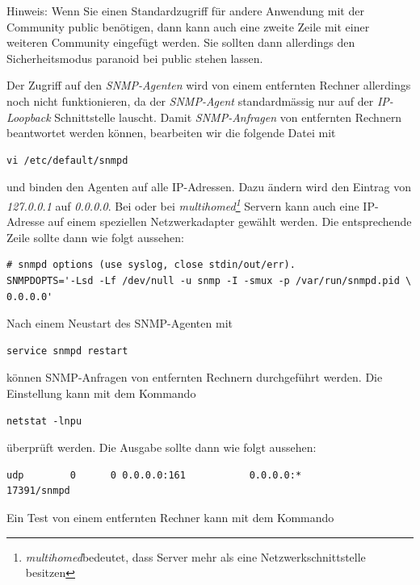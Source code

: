 Hinweis: Wenn Sie einen Standardzugriff für andere Anwendung mit der Community public benötigen, dann kann auch eine zweite Zeile mit einer weiteren Community eingefügt werden. Sie sollten dann allerdings den Sicherheitsmodus paranoid bei public stehen lassen. 

Der Zugriff auf den \emph{SNMP-Agenten} wird von einem entfernten Rechner allerdings noch nicht funktionieren, da der \emph{SNMP-Agent} standardmässig nur auf der \emph{IP-Loopback} Schnittstelle lauscht. Damit \emph{SNMP-Anfragen} von entfernten Rechnern beantwortet werden können, bearbeiten wir die folgende Datei mit

\begin{lstlisting}[numbers=none]
vi /etc/default/snmpd
\end{lstlisting}

und binden den Agenten auf alle IP-Adressen. Dazu ändern wird den Eintrag von \emph{127.0.0.1} auf \emph{0.0.0.0}. Bei oder bei \emph{multihomed\footnote{\emph{multihomed}bedeutet, dass Server mehr als eine Netzwerkschnittstelle besitzen}} Servern kann auch eine IP-Adresse auf einem speziellen Netzwerkadapter gewählt werden. Die entsprechende Zeile sollte dann wie folgt aussehen:

\begin{lstlisting}
# snmpd options (use syslog, close stdin/out/err).
SNMPDOPTS='-Lsd -Lf /dev/null -u snmp -I -smux -p /var/run/snmpd.pid \
0.0.0.0'
\end{lstlisting}

Nach einem Neustart des SNMP-Agenten mit

\begin{lstlisting}[numbers=none]
service snmpd restart
\end{lstlisting}

können SNMP-Anfragen von entfernten Rechnern durchgeführt werden. Die Einstellung kann mit dem Kommando

\begin{lstlisting}[numbers=none]
netstat -lnpu
\end{lstlisting}

überprüft werden. Die Ausgabe sollte dann wie folgt aussehen:

\begin{lstlisting}[numbers=none]
udp        0      0 0.0.0.0:161           0.0.0.0:*             17391/snmpd
\end{lstlisting}

Ein Test von einem entfernten Rechner kann mit dem Kommando

